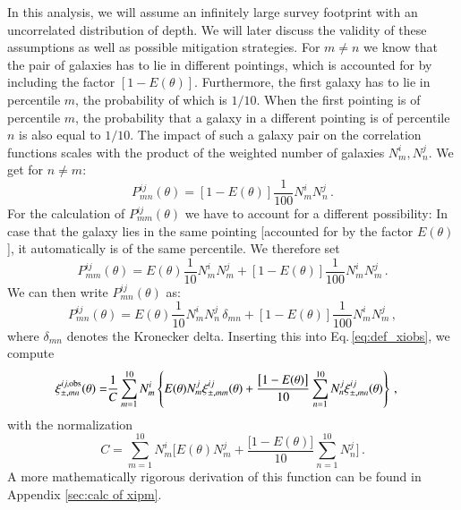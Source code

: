 In this analysis, we will assume an infinitely large survey footprint with an uncorrelated distribution of depth. We will later discuss the validity of these assumptions as well as possible mitigation strategies. For $m\neq n$ we know that the pair of galaxies has to lie in different pointings, which is accounted for by including the factor $[1-E(\theta)]$. Furthermore, the first galaxy has to lie in percentile $m$, the probability of which is $1/10$. When the first pointing is of percentile $m$, the probability that a galaxy in a different pointing is of percentile $n$ is also equal to $1/10$. The impact of such a galaxy pair on the correlation functions scales with the product of the weighted number of galaxies $N_m^i,N_n^j$. We get for $n\neq m$: \[
P_{mn}^{ij}(\theta) = [1-E(\theta)]\frac{1}{100} N_m^i N_n^j\, .
\label{eq:pmnij_corr1}
\]
For the calculation of $P_{mm}^{ij}(\theta)$ we have to account for a different possibility: In case that the galaxy lies in the same pointing [accounted for by the factor $E(\theta)$], it automatically is of the same percentile. We therefore set \[
P_{mm}^{ij}(\theta) = E(\theta)\frac{1}{10} N_m^iN_m^j + [1-E(\theta)]\frac{1}{100} N_m^i N_m^j \, .
\label{eq:pmnij_corr2}
\]
We can then write $P_{mn}^{ij}(\theta)$ as: \[
P_{mn}^{ij}(\theta) = E(\theta)\frac{1}{10} N_m^iN_n^j\,\delta_{mn} + [1-E(\theta)]\frac{1}{100} N_m^i N_m^j \, ,
\label{eq:pmnij_uncorr}
\]
where $\delta_{mn}$ denotes the Kronecker delta.
Inserting this into Eq.\,\eqref{eq:def_xiobs}, we compute
\begin{align}
\xi_{\pm,mn}^{ij,\rm{obs}}(\theta) = & \frac{1}{C}\sum_{m=1}^{10} N_m^i \left\{ E(\theta) N_m^j \xi_{\pm,mm}^{ij}(\theta) + \frac{\big[1-E(\theta)\big]}{10}\sum_{n=1}^{10}N_n^j \xi_{\pm,mn}^{ij}(\theta)\right\}\, ,
\label{eq:correctionfunction1}
\end{align}
with the normalization
\[
C = \sum_{m=1}^{10} N_m^i \bigg[ E(\theta)  N_m^j + \frac{\big[1-E(\theta)\big]}{10}\sum_{n=1}^{10} N_n^j\bigg]\, .
\]
A more mathematically rigorous derivation of this function can be found in Appendix \ref{sec:calc of xipm}.

